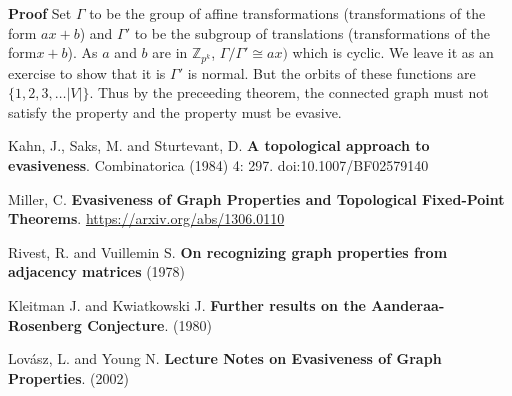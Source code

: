\documentclass[letterpaper,12pt]{article}
\begin{document}
\textbf{Proof} Set $\Gamma$ to be the group of affine transformations (transformations of the form $ax + b$) and $\Gamma'$ to be the subgroup of translations (transformations of the form$x + b$). As $a$ and $b$ are in $\mathbb{Z}_{p^k}$, $\Gamma/\Gamma' \cong ax)$ which is cyclic. We leave it as an exercise to show that it is $\Gamma'$ is normal. But the orbits of these functions are $\{ 1, 2, 3, \ldots |V| \}$. Thus by the preceeding theorem, the connected graph must not satisfy the property and the property must be evasive.

\begin{thebibliography}{10}
Kahn, J., Saks, M. and Sturtevant, D. \textbf{A topological approach to evasiveness}. Combinatorica (1984) 4: 297. doi:10.1007/BF02579140

Miller, C. \textbf{ Evasiveness of Graph Properties and Topological Fixed-Point Theorems}. \url{https://arxiv.org/abs/1306.0110}

Rivest, R. and Vuillemin S. \textbf{On recognizing graph properties from adjacency matrices} (1978)

Kleitman J. and Kwiatkowski J. \textbf{Further results on the Aanderaa-Rosenberg Conjecture}. (1980)

Lovász, L. and Young N. \textbf{Lecture Notes on Evasiveness of Graph Properties}. (2002)
\end{thebibliography}
\end{document}
